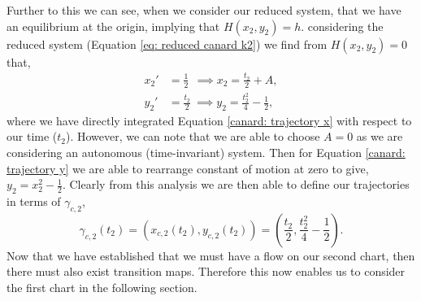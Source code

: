 Further to this we can see, when we consider our reduced system, that we have an equilibrium at the origin, implying that $H(x_2,y_2)=h$.
considering the reduced system (Equation \ref{eq: reduced canard k2}) we find from $ H(x_2,y_2)=0 $ that,
\begin{subequations}
	\begin{align}
	x_2'&=\frac{1}{2}\ \	\implies x_2=\frac{t_2}{2}+A, \label{canard: trajectory x}\\
	y_2'&=\frac{t_2}{2}\ \implies y_2=\frac{t_2^2}{4}-\frac{1}{2}, \label{canard: trajectory y}
	\end{align}
\end{subequations} 
where we have directly integrated Equation \ref{canard: trajectory x} with respect to our time ($ t_2 $). However, we can note that we are able to choose $ A=0 $ as we are considering an autonomous (time-invariant) system. Then for Equation \ref{canard: trajectory y} we are able to rearrange constant of motion at zero to give, $ y_2=x_2^2-\frac{1}{2} $. Clearly from this analysis we are then able to define our trajectories in terms of $ \gamma_{c,2} $, 
\begin{equation}
\gamma_{c,2}(t_2)=(x_{c,2}(t_2),y_{c,2}(t_2))=\left(\frac{t_2}{2},\frac{t^2_2}{4}-\frac{1}{2}\right).   
\end{equation}
Now that we have established that we must have a flow on our second chart, then there must also exist transition maps. Therefore this now enables us to consider the first chart in the following section.


